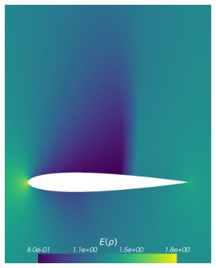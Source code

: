 \begin{figure}[h!]
\centering
	\begin{subfigure}{0.329\linewidth}
		\centering
		\includegraphics[width=\linewidth]{figs/Euler1DPlots10/euler2D_nacaCoarse_refadosipm_n2-9_sg2-4_s05_aoa_oneRet_ERho.png}
		\label{fig:sub1}
	\end{subfigure}%
	\hfill
	\begin{subfigure}{0.329\linewidth}
		\centering

\end{subfigure}
\end{figure}
